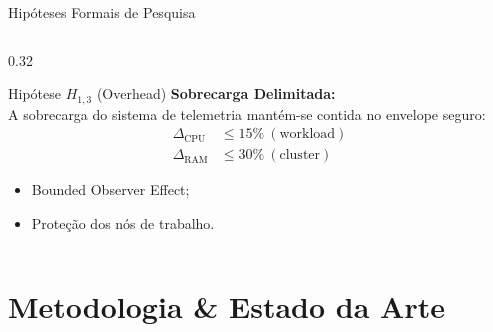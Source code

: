 \documentclass[aspectratio=169, 10pt]{beamer}
\begin{document}
\begin{frame}{Hipóteses Formais de Pesquisa}
\begin{columns}[T]
    \begin{column}{0.32\textwidth}
      \begin{alertblock}{Hipótese $H_{1,3}$ (Overhead)}
        \footnotesize
        \textbf{Sobrecarga Delimitada:}\\
        A sobrecarga do sistema de telemetria mantém-se contida no envelope seguro:
        \vspace{-1ex}
        \begin{align*}
          \Delta_{\text{CPU}} &\le 15\% \ (\text{workload})\\
          \Delta_{\text{RAM}} &\le 30\% \ (\text{cluster})
        \end{align*}
        \vspace{-1.5ex}
        \begin{itemize}
          \item Bounded Observer Effect;
          \item Proteção dos nós de trabalho.
        \end{itemize}
      \end{alertblock}
    \end{column}
  \end{columns}
\end{frame}

\section{Metodologia \& Estado da Arte}
\end{document}
